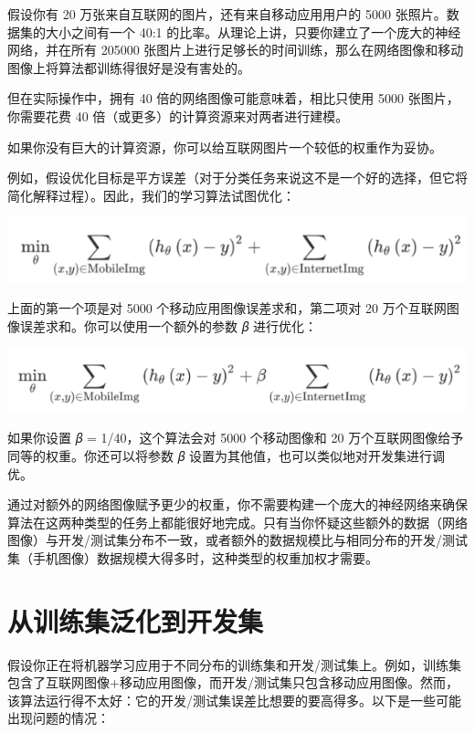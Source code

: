 假设你有 20 万张来自互联网的图片，还有来自移动应用用户的 5000
张照片。数据集的大小之间有一个 40:1
的比率。从理论上讲，只要你建立了一个庞大的神经网络，并在所有 205000
张图片上进行足够长的时间训练，那么在网络图像和移动图像上将算法都训练得很好是没有害处的。

但在实际操作中，拥有 40 倍的网络图像可能意味着，相比只使用 5000
张图片，你需要花费 40 倍（或更多）的计算资源来对两者进行建模。

如果你没有巨大的计算资源，你可以给互联网图片一个较低的权重作为妥协。

例如，假设优化目标是平方误差（对于分类任务来说这不是一个好的选择，但它将简化解释过程）。因此，我们的学习算法试图优化：

\includegraphics{./img/ch39_01.png}

上面的第一个项是对 5000 个移动应用图像误差求和，第二项对 20
万个互联网图像误差求和。你可以使用一个额外的参数 𝛽 进行优化：

\includegraphics{./img/ch39_02.png}

如果你设置 𝛽 = 1/40，这个算法会对 5000 个移动图像和 20
万个互联网图像给予同等的权重。你还可以将参数 𝛽
设置为其他值，也可以类似地对开发集进行调优。

通过对额外的网络图像赋予更少的权重，你不需要构建一个庞大的神经网络来确保算法在这两种类型的任务上都能很好地完成。只有当你怀疑这些额外的数据（网络图像）与开发/测试集分布不一致，或者额外的数据规模比与相同分布的开发/测试集（手机图像）数据规模大得多时，这种类型的权重加权才需要。

\hypertarget{ux4eceux8badux7ec3ux96c6ux6cdbux5316ux5230ux5f00ux53d1ux96c6}{%
\chapter{从训练集泛化到开发集}\label{ux4eceux8badux7ec3ux96c6ux6cdbux5316ux5230ux5f00ux53d1ux96c6}}

假设你正在将机器学习应用于不同分布的训练集和开发/测试集上。例如，训练集包含了互联网图像+移动应用图像，而开发/测试集只包含移动应用图像。然而，该算法运行得不太好：它的开发/测试集误差比想要的要高得多。以下是一些可能出现问题的情况：

